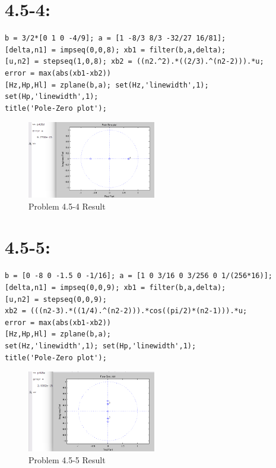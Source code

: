 \documentclass[11pt
  , a4paper
  , article
  , oneside
]{memoir}
\begin{document}
\section{4.5-4: }
\begin{lstlisting}[style=termstyle]
b = 3/2*[0 1 0 -4/9]; a = [1 -8/3 8/3 -32/27 16/81];
[delta,n1] = impseq(0,0,8); xb1 = filter(b,a,delta);
[u,n2] = stepseq(1,0,8); xb2 = ((n2.^2).*((2/3).^(n2-2))).*u;
error = max(abs(xb1-xb2))
[Hz,Hp,Hl] = zplane(b,a); set(Hz,'linewidth',1); set(Hp,'linewidth',1);
title('Pole-Zero plot');
\end{lstlisting}

\begin{figure}[h!]
	\centering
	\includegraphics[width=0.5\textwidth,height=0.25\textwidth]{./images/p405-4.png}
	\caption{Problem 4.5-4 Result}
	\label{fig:Problem 4.5-4 Result}
\end{figure}

\clearpage

\section{4.5-5: }
\begin{lstlisting}[style=termstyle]
b = [0 -8 0 -1.5 0 -1/16]; a = [1 0 3/16 0 3/256 0 1/(256*16)];
[delta,n1] = impseq(0,0,9); xb1 = filter(b,a,delta);
[u,n2] = stepseq(0,0,9);
xb2 = (((n2-3).*((1/4).^(n2-2))).*cos((pi/2)*(n2-1))).*u;
error = max(abs(xb1-xb2))
[Hz,Hp,Hl] = zplane(b,a); 
set(Hz,'linewidth',1); set(Hp,'linewidth',1);
title('Pole-Zero plot');
\end{lstlisting}

\begin{figure}[h!]
	\centering
	\includegraphics[width=0.5\textwidth,height=0.25\textwidth]{./images/p405-5.png}
	\caption{Problem 4.5-5 Result}
	\label{fig:Problem 4.5-5 Result}
\end{figure}
\end{document}
